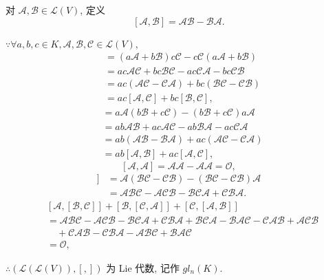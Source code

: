\documentclass[color=black,device=normal,lang=cn,mode=geye]{elegantnote}
\begin{document}
\begin{example}
    对 $\mathcal{A},\mathcal{B}\in\mathcal{L}(V)$, 定义
    \[[\mathcal{A},\mathcal{B}]=\mathcal{A}\mathcal{B}-\mathcal{B}\mathcal{A}.\]

    $\because\forall a,b,c\in K,\mathcal{A},\mathcal{B},\mathcal{C}\in\mathcal{L}(V)$,
    \begin{align*}
        [a\mathcal{A}+b\mathcal{B},c\mathcal{C}] & =(a\mathcal{A}+b\mathcal{B})c\mathcal{C}-c\mathcal{C}(a\mathcal{A}+b\mathcal{B}) \\
        & =ac\mathcal{A}\mathcal{C}+bc\mathcal{B}\mathcal{C}-ac\mathcal{C}\mathcal{A}-bc\mathcal{C}\mathcal{B} \\
        & =ac(\mathcal{A}\mathcal{C}-\mathcal{C}\mathcal{A})+bc(\mathcal{B}\mathcal{C}-\mathcal{C}\mathcal{B}) \\
        & =ac[\mathcal{A},\mathcal{C}]+bc[\mathcal{B},\mathcal{C}],
    \end{align*}
    \begin{align*}
        [a\mathcal{A},b\mathcal{B}+c\mathcal{C}] & =a\mathcal{A}(b\mathcal{B}+c\mathcal{C})-(b\mathcal{B}+c\mathcal{C})a\mathcal{A} \\
        & =ab\mathcal{A}\mathcal{B}+ac\mathcal{A}\mathcal{C}-ab\mathcal{B}\mathcal{A}-ac\mathcal{C}\mathcal{A} \\
        & =ab(\mathcal{A}\mathcal{B}-\mathcal{B}\mathcal{A})+ac(\mathcal{A}\mathcal{C}-\mathcal{C}\mathcal{A}) \\
        & =ab[\mathcal{A},\mathcal{B}]+ac[\mathcal{A},\mathcal{C}],
    \end{align*}
    \[[\mathcal{A},\mathcal{A}]=\mathcal{A}\mathcal{A}-\mathcal{A}\mathcal{A}=\mathcal{O},\]
    \begin{align*}
        [\mathcal{A},[\mathcal{B},\mathcal{C}]] & =\mathcal{A}(\mathcal{B}\mathcal{C}-\mathcal{C}\mathcal{B})-(\mathcal{B}\mathcal{C}-\mathcal{C}\mathcal{B})\mathcal{A} \\
        & =\mathcal{A}\mathcal{B}\mathcal{C}-\mathcal{A}\mathcal{C}\mathcal{B}-\mathcal{B}\mathcal{C}\mathcal{A}+\mathcal{C}\mathcal{B}\mathcal{A}.
    \end{align*}
    \begin{align*}
        & [\mathcal{A},[\mathcal{B},\mathcal{C}]]+[\mathcal{B},[\mathcal{C},\mathcal{A}]]+[\mathcal{C},[\mathcal{A},\mathcal{B}]] \\
        & =\mathcal{A}\mathcal{B}\mathcal{C}-\mathcal{A}\mathcal{C}\mathcal{B}-\mathcal{B}\mathcal{C}\mathcal{A}+\mathcal{C}\mathcal{B}\mathcal{A}+\mathcal{B}\mathcal{C}\mathcal{A}-\mathcal{B}\mathcal{A}\mathcal{C}-\mathcal{C}\mathcal{A}\mathcal{B}+\mathcal{A}\mathcal{C}\mathcal{B} \\
        & \quad+\mathcal{C}\mathcal{A}\mathcal{B}-\mathcal{C}\mathcal{B}\mathcal{A}-\mathcal{A}\mathcal{B}\mathcal{C}+\mathcal{B}\mathcal{A}\mathcal{C} \\
        & =\mathcal{O},
    \end{align*}

    $\therefore(\mathcal{L}(\mathcal{L}(V)),[,])$ 为 Lie 代数, 记作 $gl_n(K)$.
\end{example}
\end{document}
